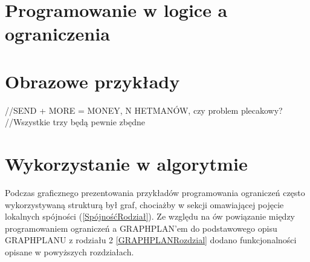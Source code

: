 \section{Programowanie w logice a ograniczenia}


\section{Obrazowe przykłady}

//SEND + MORE = MONEY, N HETMANÓW, czy problem plecakowy?
//Wszystkie trzy będą pewnie zbędne

\section{Wykorzystanie w algorytmie}

    Podczas graficznego prezentowania przykładów programowania ograniczeń często wykorzystywaną strukturą był graf, chociażby w sekcji omawiającej 
    pojęcie lokalnych spójności (\ref{SpójnośćRodział}). Ze względu na ów powiązanie między programowaniem ograniczeń a GRAPHPLAN'em do podstawowego opisu GRAPHPLANU z rodziału 2 
    \ref{GRAPHPLANRozdzial} dodano funkcjonalności opisane w powyższych rozdziałach. 

